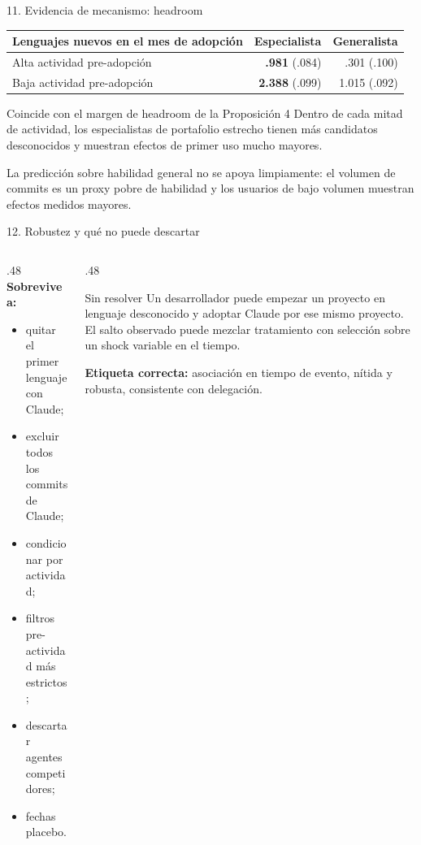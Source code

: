 \documentclass[aspectratio=169,10pt]{beamer}
\begin{document}
\begin{frame}{11. Evidencia de mecanismo: headroom}
\centering\small
\begin{tabular}{lrr}
\toprule Lenguajes nuevos en el mes de adopción & Especialista & Generalista \\
\midrule
Alta actividad pre-adopción & \textbf{.981} (.084) & .301 (.100) \\
Baja actividad pre-adopción & \textbf{2.388} (.099) & 1.015 (.092) \\
\bottomrule
\end{tabular}
\vspace{.9em}
\begin{block}{Coincide con el margen de headroom de la Proposición 4}
Dentro de cada mitad de actividad, los especialistas de portafolio estrecho tienen más candidatos desconocidos y muestran efectos de primer uso mucho mayores.
\end{block}
La predicción sobre habilidad general no se apoya limpiamente: el volumen de commits es un proxy pobre de habilidad y los usuarios de bajo volumen muestran efectos medidos mayores.
\end{frame}

\begin{frame}{12. Robustez y qué no puede descartar}
\begin{columns}[T,onlytextwidth]
\begin{column}{.48\textwidth}
\textbf{Sobrevive a:}
\begin{itemize}
\item quitar el primer lenguaje con Claude;
\item excluir todos los commits de Claude;
\item condicionar por actividad;
\item filtros pre-actividad más estrictos;
\item descartar agentes competidores;
\item fechas placebo.
\end{itemize}
\end{column}
\begin{column}{.48\textwidth}
\begin{alertblock}{Sin resolver}
Un desarrollador puede empezar un proyecto en lenguaje desconocido y adoptar Claude por ese mismo proyecto. El salto observado puede mezclar tratamiento con selección sobre un shock variable en el tiempo.
\end{alertblock}
\textbf{Etiqueta correcta:} asociación en tiempo de evento, nítida y robusta, consistente con delegación.
\end{column}
\end{columns}
\end{frame}
\end{document}
